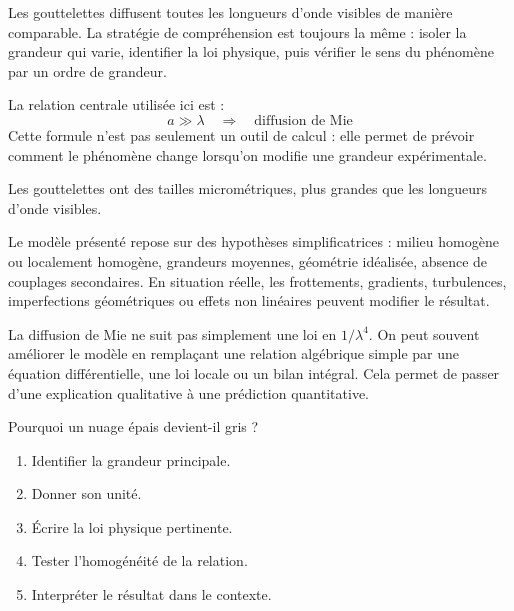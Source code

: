 \documentclass[11pt,a4paper]{article}
\begin{document}
\begin{methodebox}
Les gouttelettes diffusent toutes les longueurs d'onde visibles de manière comparable.
La stratégie de compréhension est toujours la même : isoler la grandeur qui varie, identifier la loi physique, puis vérifier le sens du phénomène par un ordre de grandeur.
\end{methodebox}

\begin{theorembox}
La relation centrale utilisée ici est :
\[
a\gg\lambda\quad\Rightarrow\quad \text{diffusion de Mie}
\]
Cette formule n'est pas seulement un outil de calcul : elle permet de prévoir comment le phénomène change lorsqu'on modifie une grandeur expérimentale.
\end{theorembox}

\begin{odgbox}
Les gouttelettes ont des tailles micrométriques, plus grandes que les longueurs d'onde visibles.
\end{odgbox}

\begin{attentionbox}
Le modèle présenté repose sur des hypothèses simplificatrices : milieu homogène ou localement homogène, grandeurs moyennes, géométrie idéalisée, absence de couplages secondaires. En situation réelle, les frottements, gradients, turbulences, imperfections géométriques ou effets non linéaires peuvent modifier le résultat.
\end{attentionbox}

\begin{approfondissementbox}
La diffusion de Mie ne suit pas simplement une loi en $1/\lambda^4$.
On peut souvent améliorer le modèle en remplaçant une relation algébrique simple par une équation différentielle, une loi locale ou un bilan intégral. Cela permet de passer d'une explication qualitative à une prédiction quantitative.
\end{approfondissementbox}

\begin{exercicebox}
Pourquoi un nuage épais devient-il gris ?
\begin{enumerate}
  \item Identifier la grandeur principale.
  \item Donner son unité.
  \item Écrire la loi physique pertinente.
  \item Tester l'homogénéité de la relation.
  \item Interpréter le résultat dans le contexte.
\end{enumerate}
\end{exercicebox}
\end{document}

